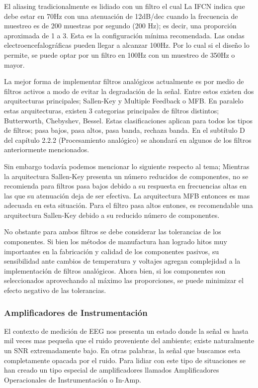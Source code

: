 El aliasing tradicionalmente es lidiado con un filtro el cual La IFCN indica que debe estar en 70Hz con una atenuación de 12dB/dec cuando la frecuencia de muestreo es de 200 muestras por segundo (200 Hz); es decir, una proporción aproximada de 1 a 3. Esta es la configuración mínima recomendada. Las ondas electroencefalográficas pueden llegar a alcanzar 100Hz. Por lo cual si el diseño lo permite, se puede optar por un filtro en 100Hz con un muestreo de 350Hz o mayor.

La mejor forma de implementar filtros analógicos actualmente es por medio de filtros activos a modo de evitar la degradación de la señal. Entre estos existen dos arquitecturas principales; Sallen-Key y Multiple Feedback o MFB. En paralelo estas arquitecturas, existen 3 categorias principales de filtros distintos; Butterworth, Chebyshev, Bessel. Estas clasificaciones aplican para todos los tipos de filtros; pasa bajos, pasa altos, pasa banda, rechaza banda. En el subtítulo D del capítulo 2.2.2 (Procesamiento analógico) se ahondará en algunos de los filtros anteriormente mencionados.

Sin embargo todavía podemos mencionar lo siguiente respecto al tema; Mientras la arquitectura Sallen-Key presenta un número reducidos de componentes, no se recomienda para filtros pasa bajos debido a su respuesta en frecuencias altas en las que su atenuación deja de ser efectiva. La arquitectura MFB entonces es mas adecuada en esta situación. Para el filtro pasa altos entones, es recomendable una arquitectura Sallen-Key debido a su reducido número de componentes.

No obstante para ambos filtros se debe considerar las tolerancias de los componentes. Si bien los métodos de manufactura han logrado hitos muy importantes en la fabricación y calidad de los componentes pasivos, su sensibilidad ante cambios de temperatura y voltajes agregan complejidad a la implementación de filtros analógicos. Ahora bien, si los componentes son seleccionados aprovechando al máximo las proporciones, se puede minimizar el efecto negativo de las tolerancias.

\subsubsection{Amplificadores de Instrumentación}
\label{sec:orga8dcee6}
El contexto de medición de EEG nos presenta un estado donde la señal es hasta mil veces mas pequeña que el ruido proveniente del ambiente; existe naturalmente un SNR extremadamente bajo. En otras palabras, la señal que buscamos esta completamente opacada por el ruido. Para lidiar con este tipo de situaciones se han creado un tipo especial de amplificadores llamados Amplificadores Operacionales de Instrumentación o In-Amp.

